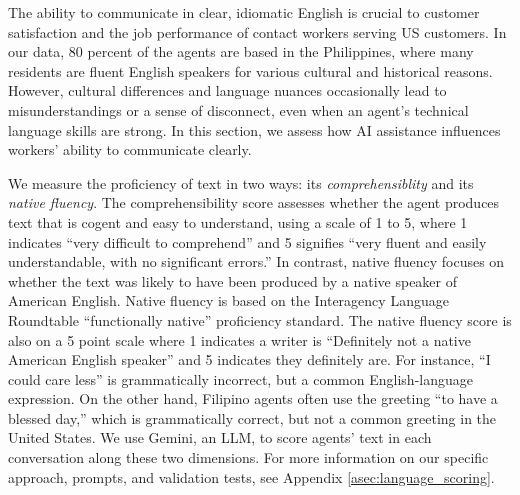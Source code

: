 \documentclass[11pt]{article}
\begin{document}
The ability to communicate in clear, idiomatic English is crucial to customer satisfaction and the job performance of contact workers serving US customers. In our data, 80 percent of the agents are based in the Philippines, where many residents are fluent English speakers for various cultural and historical reasons.  However, cultural differences and language nuances occasionally lead to misunderstandings or a sense of disconnect, even when an agent's technical language skills are strong. In this section, we assess how AI assistance influences workers' ability to communicate clearly. 


We measure the proficiency of text in two ways: its \textit{comprehensiblity} and its \textit{native fluency}. The comprehensibility score assesses whether the agent produces text that is cogent and easy to understand, using a scale of 1 to 5, where 1 indicates ``very difficult to comprehend'' and 5 signifies ``very fluent and easily understandable, with no significant errors.''  In contrast, native fluency focuses on whether the text was likely to have been produced by a native speaker of American English.  Native fluency is based on the Interagency Language Roundtable ``functionally native'' proficiency standard.  The native fluency score is also on a 5 point scale where 1 indicates a writer is ``Definitely not a native American English speaker'' and 5 indicates they definitely are.  For instance, ``I could care less'' is grammatically incorrect, but a common English-language expression. On the other hand, Filipino agents often use the greeting ``to have a blessed day,'' which is grammatically correct, but not a common greeting in the United States.  We use Gemini, an LLM, to score agents' text in each conversation along these two dimensions. For more information on our specific approach, prompts, and validation tests, see Appendix \ref{asec:language_scoring}. 
\end{document}
